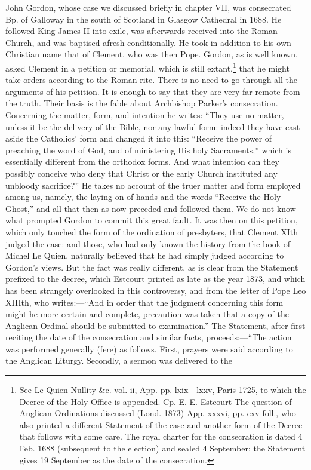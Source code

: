 John Gordon, whose case we discussed briefly in chapter VII, was consecrated Bp. of Galloway in the south of Scotland in Glasgow Cathedral in 1688. He followed King James II into exile, was afterwards received into the Roman Church, and was baptised afresh conditionally. He took in addition to his own Christian name that of Clement, who was then Pope. Gordon, as is well known, asked Clement in a petition or memorial, which is still extant,\footnote{See Le Quien Nullity \&c. vol. ii, App. pp. lxix—lxxv, Paris 1725, to which the Decree of the Holy Office is appended. Cp. E. E. Estcourt The question of Anglican Ordinations discussed (Lond. 1873) App. xxxvi, pp. cxv foll., who also printed a different Statement of the case and another form of the Decree that follows with some care. The royal charter for the consecration is dated 4 Feb. 1688 (subsequent to the election) and sealed 4 September; the Statement gives 19 September as the date of the consecration.} that he might take orders according to the Roman rite. There is no need to go through all the arguments of his petition. It is enough to say that they are very far remote from the truth. Their basis is the fable about Archbishop Parker’s consecration. Concerning the matter, form, and intention he writes: “They use no matter, unless it be the delivery of the Bible, nor any lawful form: indeed they have cast aside the Catholics’ form and changed it into this: “Receive the power of preaching the word of God, and of ministering His holy Sacraments,” which is essentially different from the orthodox forms. And what intention can they possibly conceive who deny that Christ or the early Church instituted any unbloody sacrifice?” He takes no account of the truer matter and form employed among us, namely, the laying on of hands and the words “Receive the Holy Ghost,” and all that then as now preceded and followed them. We do not know what prompted Gordon to commit this great fault. It was then on this petition, which only touched the form of the ordination of presbyters, that Clement XIth judged the case: and those, who had only known the history from the book of Michel Le Quien, naturally believed that he had simply judged according to Gordon’s views. But the fact was really different, as is clear from the Statement prefixed to the decree, which Estcourt printed as late as the year 1873, and which has been strangely overlooked in this controversy, and from the letter of Pope Leo XIIIth, who writes:—“And in order that the judgment concerning this form might he more certain and complete, precaution was taken that a copy of the Anglican Ordinal should be submitted to examination.” The Statement, after first reciting the date of the consecration and similar facts, proceeds:—“The action was performed generally (fere) as follows. First, prayers were said according to the Anglican Liturgy. Secondly, a sermon was delivered to the

